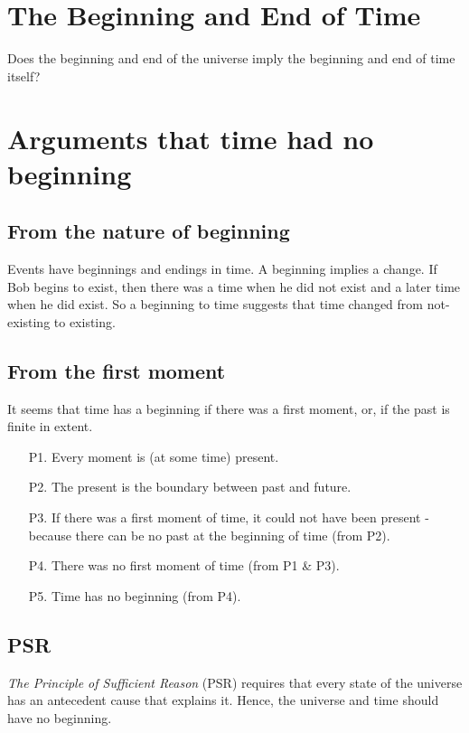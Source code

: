 \documentclass[oneside, 11]{article}
\begin{document}
\thispagestyle{fancy}

\section*{The Beginning and End of Time}

Does the beginning and end of the universe imply the beginning and end of time itself? 

\section*{Arguments that time had no beginning}

\subsection*{From the nature of beginning}
Events have beginnings and endings in time. A beginning implies a change. If Bob begins to exist, then there was a time when he did not exist and a later time when he did exist. So a beginning to time suggests that time changed from not-existing to existing. 

\subsection*{From the first moment}
It seems that time has a beginning if there was a first moment, or, if the past is finite in extent. 

\begin{itemize}
\item[P1.] Every moment is (at some time) present. 
\item[P2.] The present is the boundary between past and future.
\item[P3.] If there was a first moment of time, it could not have been present - because there can be no past at the beginning of time (from P2).
\item[P4.] There was no first moment of time (from P1 \& P3).
\item[P5.] Time has no beginning (from P4).
\end{itemize}

\subsection*{PSR}
\emph{The Principle of Sufficient Reason} (PSR) requires that every state of the universe has an antecedent cause that explains it. Hence, the universe and time should have no beginning. 
\end{document}

